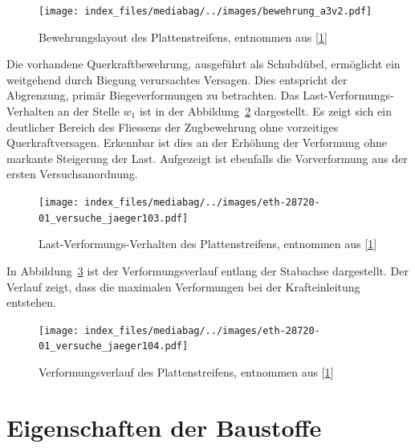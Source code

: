 \documentclass[
  12pt,
  letterpaper,
  egregdoesnotlikesansseriftitles]{scrreprt}
\begin{document}
\begin{figure}[H]

{\centering \texttt{[image: index\_files/mediabag/../images/bewehrung\_a3v2.pdf]}

}

\caption{\label{fig-bewehrung_a3v2}Bewehrungslayout des
Plattenstreifens, entnommen aus
{[}\protect\hyperlink{ref-Jaeger2006}{1}{]}}

\end{figure}

Die vorhandene Querkraftbewehrung, ausgeführt als Schubdübel, ermöglicht
ein weitgehend durch Biegung verursachtes Versagen. Dies entspricht der
Abgrenzung, primär Biegeverformungen zu betrachten. Das
Last-Verformungs-Verhalten an der Stelle \(w_1\) ist in der
Abbildung~\ref{fig-lastverformung_a3v2} dargestellt. Es zeigt sich ein
deutlicher Bereich des Fliessens der Zugbewehrung ohne vorzeitiges
Querkraftversagen. Erkennbar ist dies an der Erhöhung der Verformung
ohne markante Steigerung der Last. Aufgezeigt ist ebenfalls die
Vorverformung aus der ersten Versuchsanordnung.

\begin{figure}[H]

{\centering \texttt{[image: index\_files/mediabag/../images/eth-28720-01\_versuche\_jaeger103.pdf]}

}

\caption{\label{fig-lastverformung_a3v2}Last-Verformungs-Verhalten des
Plattenstreifens, entnommen aus
{[}\protect\hyperlink{ref-Jaeger2006}{1}{]}}

\end{figure}

In Abbildung~\ref{fig-verformungsverlauf_a3v2} ist der
Verformungsverlauf entlang der Stabachse dargestellt. Der Verlauf zeigt,
dass die maximalen Verformungen bei der Krafteinleitung entstehen.

\begin{figure}[H]

{\centering \texttt{[image: index\_files/mediabag/../images/eth-28720-01\_versuche\_jaeger104.pdf]}

}

\caption{\label{fig-verformungsverlauf_a3v2}Verformungsverlauf des
Plattenstreifens, entnommen aus
{[}\protect\hyperlink{ref-Jaeger2006}{1}{]}}

\end{figure}

\hypertarget{eigenschaften-der-baustoffe}{%
\section{Eigenschaften der
Baustoffe}\label{eigenschaften-der-baustoffe}}
\end{document}
